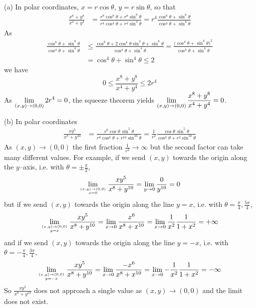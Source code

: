 \begin{solution}
(a)
In polar coordinates, $x=r\cos\theta$, $y=r\sin\theta$, so that 
\begin{align*}
\frac{x^8+y^8}{x^4+y^4}
&=\frac{r^8\cos^8\theta+r^8\sin^8\theta}{r^4\cos^4\theta+r^4\sin^4\theta}
=r^4\frac{\cos^8\theta+\sin^8\theta}{\cos^4\theta+\sin^4\theta}
\end{align*}
As
\begin{align*}
\frac{\cos^8\theta+\sin^8\theta}{\cos^4\theta+\sin^4\theta}
&\le \frac{\cos^8\theta+2\cos^4\theta\sin^4\theta+\sin^8\theta}
             {\cos^4\theta+\sin^4\theta}
=\frac{\big(\cos^4\theta+\sin^4\theta\big)^2}{\cos^4\theta+\sin^4\theta} \\
&=\cos^4\theta+\sin^4\theta
\le 2
\end{align*}
we have
\begin{equation*}
0\le \frac{x^8+y^8}{x^4+y^4}\le 2r^4
\end{equation*}
As $\displaystyle\lim_{(x,y)\to (0,0)}2r^4=0$, the squeeze theorem yields
 $\displaystyle\lim_{(x,y)\to(0,0)}\frac{x^8+y^8}{x^4+y^4}=0$.

(b)  
In polar coordinates
\begin{align*}
\frac{xy^5}{x^8+y^{10}}
&=\frac{r^6\cos\theta\,\sin^5\theta}{r^8\cos^8\theta+r^{10}\sin^{10}\theta}
=\frac{1}{r^2}\frac{\cos\theta\,\sin^5\theta}{\cos^8\theta+r^2\sin^{10}\theta}
\end{align*}
As $(x,y)\to (0,0)$ the first fraction $\frac{1}{r^2}\to\infty$ but the second
factor can take many different values. For example, if we send $(x,y)$
towards the origin along the $y$--axis, i.e. with 
$\theta=\pm\frac{\pi}{2}$,
\begin{align*}
\lim_{\Atop {(x,y)\to(0,0)}{x=0}}\frac{xy^5}{x^8+y^{10}}
=\lim_{y\to 0} \frac{0}{y^{10}}=0
\end{align*} 
but if we send $(x,y)$ towards the origin along the line $y=x$, 
i.e. with  $\theta=\frac{\pi}{4},\frac{5\pi}{4}$,
\begin{align*}
\lim_{\Atop {(x,y)\to(0,0)}{y=x} }\frac{xy^5}{x^8+y^{10}}
=\lim_{x\to 0} \frac{x^6}{x^8+x^{10}}
=\lim_{x\to 0} \frac{1}{x^2}\frac{1}{1+x^2}
=+\infty
\end{align*} 
and if we send $(x,y)$ towards the origin along the line $y=-x$, 
i.e. with  $\theta=-\frac{\pi}{4},\frac{3\pi}{4}$,
\begin{align*}
\lim_{\Atop {(x,y)\to(0,0)}{y=-x} }\frac{xy^5}{x^8+y^{10}}
=\lim_{x\to 0} \frac{-x^6}{x^8+x^{10}}
=\lim_{x\to 0}- \frac{1}{x^2}\frac{1}{1+x^2}
=-\infty
\end{align*} 
So $\frac{xy^5}{x^8+y^{10}}$ does not approach a single value as 
$(x,y)\to(0,0)$ and the limit does not exist.

\end{solution}

